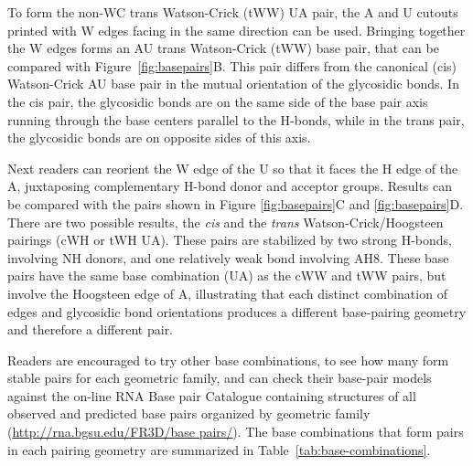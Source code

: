 To form the non-WC trans Watson-Crick (tWW) UA pair, the A and U cutouts printed
with W edges facing in the same direction can be used.  Bringing together the W
edges forms an AU trans Watson-Crick (tWW) base pair, that can be compared with
Figure~\ref{fig:basepairs}B. This pair differs from the canonical (cis) Watson-Crick AU base pair
in the mutual orientation of the glycosidic bonds. In the cis pair, the
glycosidic bonds are on the same side of the base pair axis running through the
base centers parallel to the H-bonds, while in the trans pair, the glycosidic
bonds are on opposite sides of this axis.  

Next readers can reorient the W edge of the U so that it faces the H edge of the
A, juxtaposing complementary H-bond donor and acceptor groups. Results can be
compared with the pairs shown in Figure \ref{fig:basepairs}C and
\ref{fig:basepairs}D. There are two possible results, the \emph{cis} and the
\emph{trans} Watson-Crick/Hoogsteen pairings (cWH or tWH UA). These pairs are
stabilized by two strong H-bonds, involving NH donors, and one relatively weak
bond involving AH8. These base pairs have the same base combination (UA) as the
cWW and tWW pairs, but involve the Hoogsteen edge of A, illustrating that each
distinct combination of edges and glycosidic bond orientations produces a
different base-pairing geometry and therefore a different pair. 

Readers are encouraged to try other base combinations, to see how many form
stable pairs for each geometric family, and can check their base-pair models
against the on-line RNA Base pair Catalogue containing structures of all
observed and predicted base pairs organized by geometric family
(\url{http://rna.bgsu.edu/FR3D/base pairs/}). The base combinations that form
pairs in each pairing geometry are summarized in Table~\ref{tab:base-combinations}.

